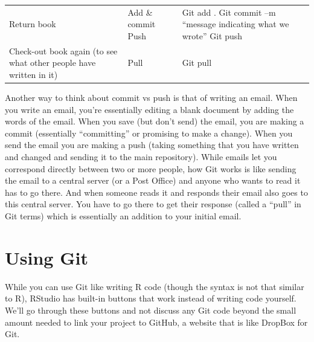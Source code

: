 \documentclass[
  12pt,
]{book}
\begin{document}
\begin{longtable}[]{@{}lll@{}}
\begin{minipage}[t]{0.30\columnwidth}
Return book\strut
\end{minipage} & \begin{minipage}[t]{0.30\columnwidth}\raggedright
Add \& commit Push\strut
\end{minipage} & \begin{minipage}[t]{0.30\columnwidth}\raggedright
Git add . Git commit --m ``message indicating what we wrote'' Git push\strut
\end{minipage}\tabularnewline
\begin{minipage}[t]{0.30\columnwidth}\raggedright
Check-out book again (to see what other people have written in it)\strut
\end{minipage} & \begin{minipage}[t]{0.30\columnwidth}\raggedright
Pull\strut
\end{minipage} & \begin{minipage}[t]{0.30\columnwidth}\raggedright
Git pull\strut
\end{minipage}\tabularnewline
\bottomrule
\end{longtable}

Another way to think about commit vs push is that of writing an email. When you write an email, you're essentially editing a blank document by adding the words of the email. When you save (but don't send) the email, you are making a commit (essentially ``committing'' or promising to make a change). When you send the email you are making a push (taking something that you have written and changed and sending it to the main repository). While emails let you correspond directly between two or more people, how Git works is like sending the email to a central server (or a Post Office) and anyone who wants to read it has to go there. And when someone reads it and responds their email also goes to this central server. You have to go there to get their response (called a ``pull'' in Git terms) which is essentially an addition to your initial email.

\hypertarget{using-git}{%
\section{Using Git}\label{using-git}}

While you can use Git like writing R code (though the syntax is not that similar to R), RStudio has built-in buttons that work instead of writing code yourself. We'll go through these buttons and not discuss any Git code beyond the small amount needed to link your project to GitHub, a website that is like DropBox for Git.
\end{document}
